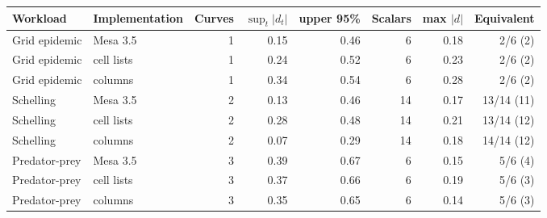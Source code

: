 \begin{tabular}{llrrrrrr}
\toprule
Workload & Implementation & Curves & $\sup_t |d_t|$ & upper 95\% & Scalars & max $|d|$ & Equivalent \\
\midrule
Grid epidemic & Mesa 3.5 & 1 & 0.15 & 0.46 & 6 & 0.18 & 2/6 (2) \\
Grid epidemic & cell lists & 1 & 0.24 & 0.52 & 6 & 0.23 & 2/6 (2) \\
Grid epidemic & columns & 1 & 0.34 & 0.54 & 6 & 0.28 & 2/6 (2) \\
Schelling & Mesa 3.5 & 2 & 0.13 & 0.46 & 14 & 0.17 & 13/14 (11) \\
Schelling & cell lists & 2 & 0.28 & 0.48 & 14 & 0.21 & 13/14 (12) \\
Schelling & columns & 2 & 0.07 & 0.29 & 14 & 0.18 & 14/14 (12) \\
Predator-prey & Mesa 3.5 & 3 & 0.39 & 0.67 & 6 & 0.15 & 5/6 (4) \\
Predator-prey & cell lists & 3 & 0.37 & 0.66 & 6 & 0.19 & 5/6 (3) \\
Predator-prey & columns & 3 & 0.35 & 0.65 & 6 & 0.14 & 5/6 (3) \\
\bottomrule
\end{tabular}
